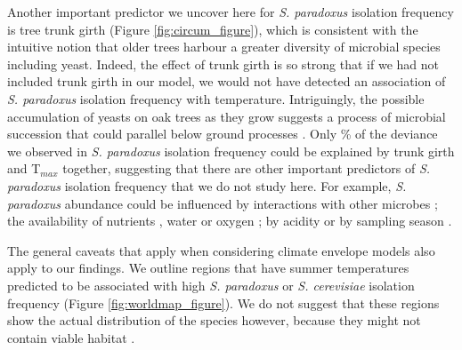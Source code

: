 \documentclass[12pt]{article}
\begin{document}
\begin{linenumbers}
Another important predictor we uncover here for \textit{S. paradoxus} isolation frequency is tree trunk girth (Figure \ref{fig:circum_figure}), which is consistent with the intuitive notion that older trees harbour a greater diversity of microbial species including yeast. Indeed, the effect of trunk girth is so strong that if we had not included trunk girth in our model, we would not have detected an association of \textit{S. paradoxus} isolation frequency with temperature. Intriguingly, the possible accumulation of yeasts on oak trees as they grow suggests a process of microbial succession that could parallel below ground processes \citep{bardgett_temporal_2005,bardgett_biology_2005}. Only \finalpcentdev\% of the deviance we observed in \textit{S. paradoxus} isolation frequency could be explained by trunk girth and T$_{max}$ together, suggesting that there are other important predictors of \textit{S. paradoxus} isolation frequency that we do not study here. For example, \textit{S. paradoxus} abundance could be influenced by interactions with other microbes \citep{kowallik_interaction_2015}; the availability of nutrients \citep{sampaio_natural_2008}, water or oxygen \citep{deak_environmental_2006}; by acidity \citep{deak_environmental_2006} or by sampling season \citep{glushakova_massive_2007,charron_exploring_2014}.

The general caveats that apply when considering climate envelope models \citep{araujo_uses_2012,jarnevich_caveats_2015} also apply to our findings. We outline regions that have summer temperatures predicted to be associated with high \textit{S. paradoxus} or \textit{S. cerevisiae} isolation frequency (Figure \ref{fig:worldmap_figure}). We do not suggest that these regions show the actual distribution of the species however, because they might not contain viable habitat \citep{araujo_uses_2012,jarnevich_caveats_2015}. 


\end{linenumbers}
\end{document}
